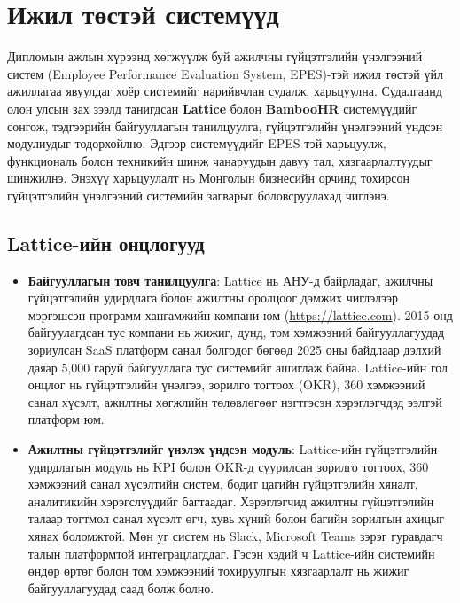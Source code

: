 \newpage
\section{Ижил төстэй системүүд}
Дипломын ажлын хүрээнд хөгжүүлж буй ажилчны гүйцэтгэлийн үнэлгээний систем (Employee Performance Evaluation System, EPES)-тэй ижил төстэй үйл ажиллагаа явуулдаг 
хоёр системийг нарийвчлан судалж, харьцуулна. Судалгаанд олон улсын зах зээлд танигдсан \textbf{Lattice} болон \textbf{BambooHR} системүүдийг сонгож, тэдгээрийн 
байгууллагын танилцуулга, гүйцэтгэлийн үнэлгээний үндсэн модулиудыг тодорхойлно. Эдгээр системүүдийг EPES-тэй харьцуулж, функциональ болон техникийн шинж чанаруудын 
давуу тал, хязгаарлалтуудыг шинжилнэ. Энэхүү харьцуулалт нь Монголын бизнесийн орчинд тохирсон гүйцэтгэлийн үнэлгээний системийн загварыг боловсруулахад чиглэнэ.

\subsection{Lattice-ийн онцлогууд}
\begin{itemize}
    \item \textbf{Байгууллагын товч танилцуулга}: Lattice нь АНУ-д байрладаг, ажилчны гүйцэтгэлийн удирдлага болон ажилтны оролцоог дэмжих чиглэлээр мэргэшсэн 
    программ хангамжийн компани юм (\url{https://lattice.com}). 2015 онд байгуулагдсан тус компани нь жижиг, дунд, том хэмжээний байгууллагуудад зориулсан SaaS 
    платформ санал болгодог бөгөөд 2025 оны байдлаар дэлхий даяар 5,000 гаруй байгууллага тус системийг ашиглаж байна. Lattice-ийн гол онцлог нь гүйцэтгэлийн үнэлгээ, 
    зорилго тогтоох (OKR), 360 хэмжээний санал хүсэлт, ажилтны хөгжлийн төлөвлөгөөг нэгтгэсэн хэрэглэгчдэд ээлтэй платформ юм.
    \item \textbf{Ажилтны гүйцэтгэлийг үнэлэх үндсэн модуль}: Lattice-ийн гүйцэтгэлийн удирдлагын модуль нь KPI болон OKR-д суурилсан зорилго тогтоох, 360 хэмжээний 
    санал хүсэлтийн систем, бодит цагийн гүйцэтгэлийн хяналт, аналитикийн хэрэгслүүдийг багтаадаг. Хэрэглэгчид ажилтны гүйцэтгэлийн талаар тогтмол санал хүсэлт өгч, 
    хувь хүний болон багийн зорилгын ахицыг хянах боломжтой. Мөн уг систем нь Slack, Microsoft Teams зэрэг гуравдагч талын платформтой интеграцлагддаг. Гэсэн хэдий ч 
    Lattice-ийн системийн өндөр өртөг болон том хэмжээний тохируулгын хязгаарлалт нь жижиг байгууллагуудад саад болж болно.
\end{itemize}

